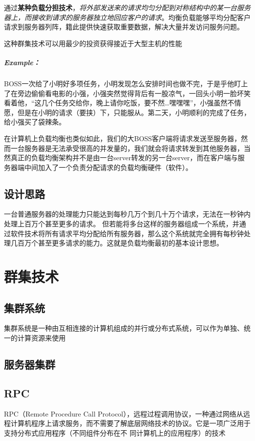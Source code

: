 \documentclass[UTF8,a4paper,8pt]{ctexbook}
\begin{document}
			通过\textbf{某种负载分担技术}，\textit{将外部发送来的请求均匀分配到对称结构中的某一台服务器上，而接收到请求的服务器独立地回应客户的请求}。均衡负载能够平均分配客户请求到服务器列阵，籍此提供快速获取重要数据，解决大量并发访问服务问题。
			
			这种群集技术可以用最少的投资获得接近于大型主机的性能
		
		\subparagraph{Example：}
			BOSS一次给了小明好多项任务，小明发现怎么安排时间也做不完，于是乎他盯上了在旁边偷偷看电影的小强，小强突然觉得背后有一股凉气，一回头小明一脸坏笑看着他，“这几个任务交给你，晚上请你吃饭，要不然…嘿嘿嘿”，小强虽然不情愿，但是在小明的请求（要挟）下，只能服从。第二天，小明顺利的完成了任务，给小强买了袋辣条。
			
			在计算机上负载均衡也类似如此，我们的大BOSS客户端将请求发送至服务器，然而一台服务器是无法承受很高的并发量的，我们就会将请求转发到其他服务器，当然真正的负载均衡架构并不是由一台server转发的另一台server，而在客户端与服务器端中间加入了一个负责分配请求的负载均衡硬件（软件）。
		\subsection{设计思路}
			一台普通服务器的处理能力只能达到每秒几万个到几十万个请求，无法在一秒钟内处理上百万个甚至更多的请求。
			但若能将多台这样的服务器组成一个系统，并通过软件技术将所有请求平均分配给所有服务器，那么这个系统就完全拥有每秒钟处理几百万个甚至更多请求的能力。这就是负载均衡最初的基本设计思想。
	
	\section{群集技术}		
		\subsection{集群系统}集群系统是一种由互相连接的计算机组成的并行或分布式系统，可以作为单独、统一的计算资源来使用
	
		\subsection{服务器集群}
	
		\subsection{RPC}
			RPC（Remote Procedure Call Protocol），远程过程调用协议，一种通过网络从远程计算机程序上请求服务，而不需要了解底层网络技术的协议。它是一项广泛用于支持分布式应用程序（不同组件分布在不 同计算机上的应用程序）的技术
			
\end{document}
